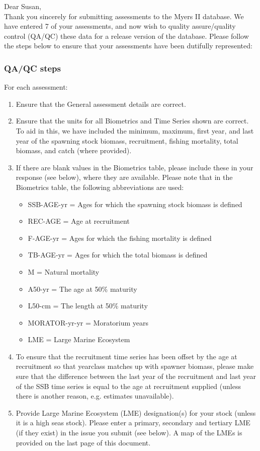 \documentclass [a4paper, 10pt] {article}
\begin{document}
\noindent Dear Susan,\\

\noindent Thank you sincerely for submitting assessments to the Myers II database. We have entered 7 of your assessments, and now wish to quality assure/quality control (QA/QC) these data for a release version of the database. Please follow the steps below to ensure that your assessments have been dutifully represented:
\subsubsection{QA/QC steps}
For each assessment:
\begin{enumerate}
\item Ensure that the General assessment details are correct.
\item Ensure that the units for all Biometrics and Time Series shown are correct. To aid in this, we have included the minimum, maximum, first year, and last year of the spawning stock biomass, recruitment, fishing mortality, total biomass, and  catch  (where provided). 
\item If there are blank values in the Biometrics table, please include these in your response (see below), where they are available.
Please note that in the Biometrics table, the following abbreviations are used:
\begin{itemize}
\item SSB-AGE-yr  = Ages for which the spawning stock biomass is defined
\item REC-AGE     = Age at recruitment
\item F-AGE-yr    = Ages for which the fishing mortality is defined 
\item TB-AGE-yr   = Ages for which the total biomass is defined
\item M      = Natural mortality
\item A50-yr      = The age at 50\% maturity
\item L50-cm      = The length at 50\% maturity
\item MORATOR-yr-yr = Moratorium years
\item LME = Large Marine Ecosystem\\
\end{itemize}
\item To ensure that the recruitment time series has been offset by the age at recruitment so that yearclass matches up with spawner biomass, please make sure that the difference between the last year of the recruitment and last year of the SSB time series is equal to the age at recruitment supplied (unless there is another reason, e.g. estimates unavailable). 
\item Provide Large Marine Ecosystem (LME) designation(s) for your stock (unless it is a high seas stock). Please enter a primary, secondary and tertiary LME (if they exist) in the issue you submit (see below). A map of the LMEs is provided on the last page of this document. 
\end{enumerate}
\vspace{-.25in}
\end{document}
